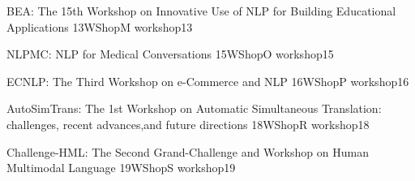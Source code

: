 \begin{wsschedule}
    {BEA: The 15th Workshop on Innovative Use of NLP for Building Educational Applications}
    {13}{WShopM}
    {workshop13}
    {\WShopLocM}
    
\end{wsschedule}

%     

\begin{wsschedule}
    {NLPMC: NLP for Medical Conversations}
    {15}{WShopO}
    {workshop15}
    {\WShopLocO}
    
\end{wsschedule}

\begin{wsschedule}
    {ECNLP: The Third Workshop on e-Commerce and NLP}
    {16}{WShopP}
    {workshop16}
    {\WShopLocP}
    
\end{wsschedule}

%     

\begin{wsschedule}
    {AutoSimTrans: The 1st Workshop on Automatic Simultaneous Translation: challenges, recent advances,and future directions}
    {18}{WShopR}
    {workshop18}
    {\WShopLocR}
    
\end{wsschedule}

\begin{wsschedule}
    {Challenge-HML: The Second Grand-Challenge and Workshop on Human Multimodal Language}
    {19}{WShopS}
    {workshop19}
    {\WShopLocS}
    
\end{wsschedule}

